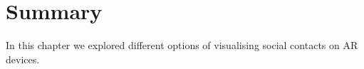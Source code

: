 \section{Summary}

In this chapter we explored different options of visualising social contacts on AR devices.

